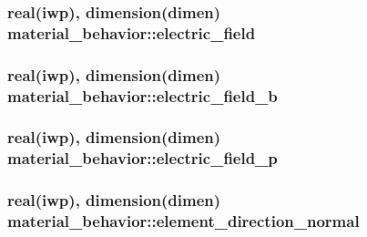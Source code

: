 \subsubsection[{electric\+\_\+field}]{\setlength{\rightskip}{0pt plus 5cm}real(iwp), dimension(dimen) material\+\_\+behavior\+::electric\+\_\+field}\label{classmaterial__behavior_a3ade0d21c66ab32510bf21daeb7fc6a8}
\hypertarget{classmaterial__behavior_a05e1e699be346a40a312263aed02b288}{}
\subsubsection[{electric\+\_\+field\+\_\+b}]{\setlength{\rightskip}{0pt plus 5cm}real(iwp), dimension(dimen) material\+\_\+behavior\+::electric\+\_\+field\+\_\+b}\label{classmaterial__behavior_a05e1e699be346a40a312263aed02b288}
\hypertarget{classmaterial__behavior_a49ab2ce38e4c0c8efd718655af3ff7df}{}
\subsubsection[{electric\+\_\+field\+\_\+p}]{\setlength{\rightskip}{0pt plus 5cm}real(iwp), dimension(dimen) material\+\_\+behavior\+::electric\+\_\+field\+\_\+p}\label{classmaterial__behavior_a49ab2ce38e4c0c8efd718655af3ff7df}
\hypertarget{classmaterial__behavior_a9923e96c82dc6a2982a9f457a2573ee8}{}
\subsubsection[{element\+\_\+direction\+\_\+normal}]{\setlength{\rightskip}{0pt plus 5cm}real(iwp), dimension(dimen) material\+\_\+behavior\+::element\+\_\+direction\+\_\+normal}\label{classmaterial__behavior_a9923e96c82dc6a2982a9f457a2573ee8}
\hypertarget{classmaterial__behavior_a21b3e10af3e83d240da32039cbbdadd8}{}
